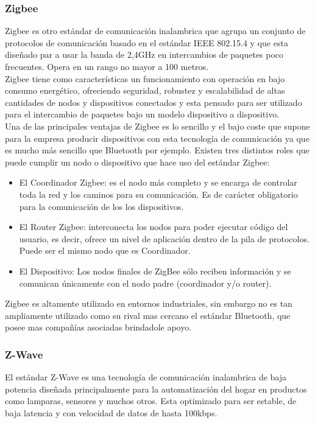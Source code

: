 \subsubsection{Zigbee}
Zigbee es otro estándar de comunicación inalambrica que agrupa un conjunto de protocolos de comunicación basado en el estándar IEEE 802.15.4\cite{ieeezigbee} y que esta diseñado par a usar la banda de 2,4GHz en intercambios de paquetes poco frecuentes. Opera en un rango no mayor a 100 metros.\\

Zigbee tiene como características un funcionamiento con operación en bajo consumo energético, ofreciendo seguridad, robustez y escalabilidad de altas cantidades de nodos y dispositivos conectados y esta  pensado para ser utilizado para el intercambio de paquetes bajo un modelo dispositivo a dispositivo.\cite{iotstandars}\\

Una de las principales ventajas de Zigbee es lo sencillo y el bajo coste que supone para la empresa producir dispositivos con esta tecnología de comunicación ya que es mucho más sencillo que Bluetooth por ejemplo.\cite{androidzigbee} Existen tres distintos roles que puede cumplir un nodo o dispositivo que hace uso del estándar Zigbee:
\begin{itemize}
\item El Coordinador Zigbee: es el nodo más completo y se encarga de controlar toda la red y los caminos para su comunicación.\cite{androidzigbee} Es de carácter obligatorio para la comunicación de los los dispositivos.
\item El Router Zigbee: interconecta los nodos para poder ejecutar código del usuario, es decir, ofrece un nivel de aplicación dentro de la pila de protocolos.\cite{androidzigbee} Puede ser el mismo nodo que es Coordinador.
\item El Dispositivo: Los nodos finales de ZigBee sólo reciben información y se comunican únicamente con el nodo padre (coordinador y/o router).\cite{androidzigbee}
\end{itemize}

Zigbee es altamente utilizado en entornos industriales, sin embargo no es tan ampliamente utilizado como su rival mas cercano el estándar Bluetooth, que posee mas compañías asociadas brindadole apoyo. 

\subsubsection{Z-Wave}
El estándar Z-Wave es una tecnología de comunicación inalambrica de baja potencia diseñada principalmente para la automatización del hogar en productos como lamparas, sensores y muchos otros. Esta optimizado para ser estable, de baja latencia y con velocidad de datos de hasta 100kbps.\cite{iotstandars}\\

